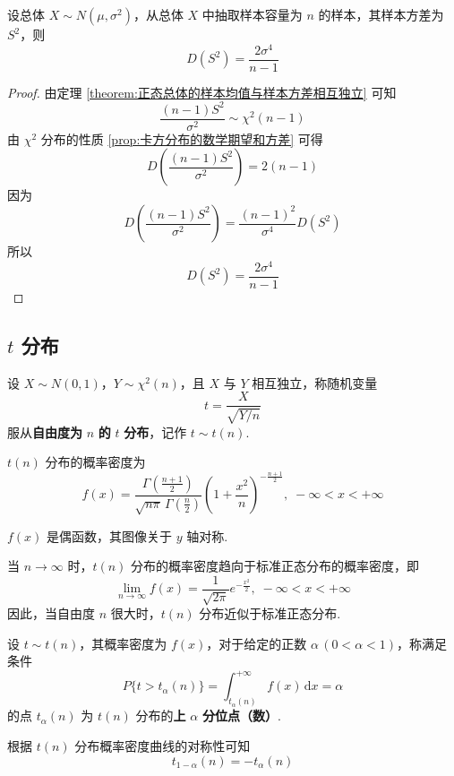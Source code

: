 \begin{theorem}
    设总体 $X \sim N(\mu,\sigma^2)$，从总体 $X$ 中抽取样本容量为 $n$ 的样本，其样本方差为 $S^2$，则
    $$
    D(S^2) = \dfrac{2 \sigma^4}{n-1}
    $$
\end{theorem}

\begin{proof}
    由定理 \ref{theorem:正态总体的样本均值与样本方差相互独立} 可知
    $$
    \dfrac{(n-1) S^2}{\sigma^2} \sim \chi^2(n-1)
    $$
    由 $\chi^2$ 分布的性质 \ref*{prop:卡方分布的数学期望和方差} 可得
    $$
    D \left( \dfrac{(n-1) S^2}{\sigma^2} \right) = 2(n-1)
    $$
    因为
    $$
    D \left( \dfrac{(n-1) S^2}{\sigma^2} \right) = \dfrac{(n-1)^2}{\sigma^4} D(S^2)
    $$
    所以
    $$
    D(S^2) = \dfrac{2 \sigma^4}{n-1}
    $$
\end{proof}

\subsection{\texorpdfstring{$t$}{} 分布}

\begin{definition} \label{def:t分布}
    设 $X \sim N(0,1)$，$Y \sim \chi^2(n)$，且 $X$ 与 $Y$ 相互独立，称随机变量
    $$
    t = \dfrac{X}{\sqrt{Y/n}}
    $$
    服从\textbf{自由度为} $n$ \textbf{的} $t$ \textbf{分布}，记作 $t \sim t(n)$.
\end{definition}

$t(n)$ 分布的概率密度为
$$
f(x) = \dfrac{\Gamma(\frac{n+1}{2})}{\sqrt{n \pi} \, \Gamma(\frac{n}{2})} \left( 1 + \dfrac{x^2}{n} \right)^{-\frac{n+1}{2}}, \; -\infty < x < +\infty
$$

$f(x)$ 是偶函数，其图像关于 $y$ 轴对称.

当 $n \to \infty$ 时，$t(n)$ 分布的概率密度趋向于标准正态分布的概率密度，即
$$
\lim_{n \to \infty} f(x) = \dfrac{1}{\sqrt{2 \pi}} e^{-\frac{x^2}{2}}, \; -\infty < x < +\infty
$$
因此，当自由度 $n$ 很大时，$t(n)$ 分布近似于标准正态分布.

\begin{definition}
    设 $t \sim t(n)$，其概率密度为 $f(x)$，对于给定的正数 $\alpha \, (0 < \alpha < 1)$，称满足条件
    $$
    P \{ t > t_{\alpha}(n) \} = \int_{t_{\alpha}(n)}^{+\infty} f(x) \, \text{d}x = \alpha
    $$
    的点 $t_{\alpha}(n)$ 为 $t(n)$ 分布的\textbf{上} $\alpha$ \textbf{分位点（数）}.
\end{definition}

根据 $t(n)$ 分布概率密度曲线的对称性可知
$$
t_{1 - \alpha}(n) = -t_{\alpha}(n)
$$

